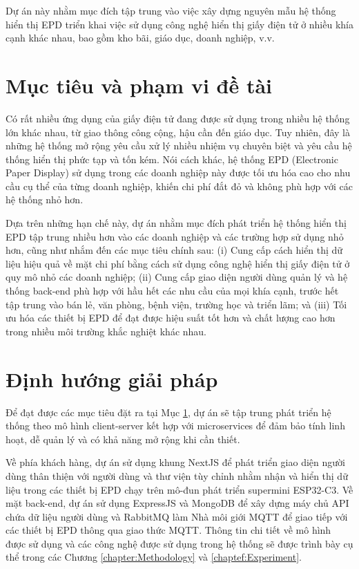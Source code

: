 \documentclass[../DoAn.tex]{subfiles}
\begin{document}
Dự án này nhằm mục đích tập trung vào việc xây dựng nguyên mẫu hệ thống hiển thị EPD triển khai việc sử dụng công nghệ hiển thị giấy điện tử ở nhiều khía cạnh khác nhau, bao gồm kho bãi, giáo dục, doanh nghiệp, v.v.

\section{Mục tiêu và phạm vi đề tài}
\label{section:1.2}
Có rất nhiều ứng dụng của giấy điện tử đang được sử dụng trong nhiều hệ thống lớn khác nhau, từ giao thông công cộng, hậu cần đến giáo dục. Tuy nhiên, đây là những hệ thống mở rộng yêu cầu xử lý nhiều nhiệm vụ chuyên biệt và yêu cầu hệ thống hiển thị phức tạp và tốn kém. Nói cách khác, hệ thống EPD (Electronic Paper Display) sử dụng trong các doanh nghiệp này được tối ưu hóa cao cho nhu cầu cụ thể của từng doanh nghiệp, khiến chi phí đắt đỏ và không phù hợp với các hệ thống nhỏ hơn.

Dựa trên những hạn chế này, dự án nhằm mục đích phát triển hệ thống hiển thị EPD tập trung nhiều hơn vào các doanh nghiệp và các trường hợp sử dụng nhỏ hơn, cũng như nhắm đến các mục tiêu chính sau: (i) Cung cấp cách hiển thị dữ liệu hiệu quả về mặt chi phí bằng cách sử dụng công nghệ hiển thị giấy điện tử ở quy mô nhỏ các doanh nghiệp; (ii) Cung cấp giao diện người dùng quản lý và hệ thống back-end phù hợp với hầu hết các nhu cầu của mọi khía cạnh, trước hết tập trung vào bán lẻ, văn phòng, bệnh viện, trường học và triển lãm; và (iii) Tối ưu hóa các thiết bị EPD để đạt được hiệu suất tốt hơn và chất lượng cao hơn trong nhiều môi trường khắc nghiệt khác nhau.

\section{Định hướng giải pháp}
\label{section:1.3}
Để đạt được các mục tiêu đặt ra tại Mục \ref{section:1.2}, dự án sẽ tập trung phát triển hệ thống theo mô hình client-server kết hợp với microservices để đảm bảo tính linh hoạt, dễ quản lý và có khả năng mở rộng khi cần thiết.

Về phía khách hàng, dự án sử dụng khung NextJS để phát triển giao diện người dùng thân thiện với người dùng và thư viện tùy chỉnh nhằm nhận và hiển thị dữ liệu trong các thiết bị EPD chạy trên mô-đun phát triển supermini ESP32-C3. Về mặt back-end, dự án sử dụng ExpressJS và MongoDB để xây dựng máy chủ API chứa dữ liệu người dùng và RabbitMQ làm Nhà môi giới MQTT để giao tiếp với các thiết bị EPD thông qua giao thức MQTT. Thông tin chi tiết về mô hình được sử dụng và các công nghệ được sử dụng trong hệ thống sẽ được trình bày cụ thể trong các Chương \ref{chapter:Methodology} và \ref{chaptef:Experiment}.
\end{document}
